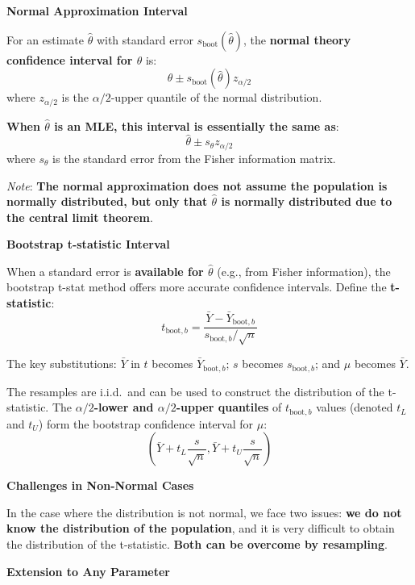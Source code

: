 \documentclass[12pt,a4paper]{article}
\begin{document}
\vspace{0.5em}

\textbf{Normal Approximation Interval}

For an estimate $\hat{\theta}$ with standard error $s_{\text{boot}}(\hat{\theta})$, the \textbf{normal theory confidence interval for $\theta$} is:
\[
\hat{\theta} \pm s_{\text{boot}}(\hat{\theta}) z_{\alpha/2}
\]
where $z_{\alpha/2}$ is the $\alpha/2$-upper quantile of the normal distribution.

\textbf{When $\hat{\theta}$ is an MLE, this interval is essentially the same as}:
\[
\hat{\theta} \pm s_\theta z_{\alpha/2}
\]
where $s_\theta$ is the standard error from the Fisher information matrix.

\textit{Note}: \textbf{The normal approximation does not assume the population is normally distributed, but only that $\hat{\theta}$ is normally distributed due to the central limit theorem}.

\vspace{0.5em}

\textbf{Bootstrap t-statistic Interval}

When a standard error is \textbf{available for $\hat{\theta}$} (e.g., from Fisher information), the bootstrap t-stat method offers more accurate confidence intervals. Define the \textbf{t-statistic}:
\[
t_{\text{boot},b} = \frac{\bar{Y} - \bar{Y}_{\text{boot},b}}{s_{\text{boot},b}/\sqrt{n}}
\]

The key substitutions: $\bar{Y}$ in $t$ becomes $\bar{Y}_{\text{boot},b}$; $s$ becomes $s_{\text{boot},b}$; and $\mu$ becomes $\bar{Y}$.

The resamples are i.i.d.\ and can be used to construct the distribution of the t-statistic. The \textbf{$\alpha/2$-lower and $\alpha/2$-upper quantiles} of $t_{\text{boot},b}$ values (denoted $t_L$ and $t_U$) form the bootstrap confidence interval for $\mu$:
\[
\left(\bar{Y} + t_L \frac{s}{\sqrt{n}}, \bar{Y} + t_U \frac{s}{\sqrt{n}}\right)
\]

\textbf{Challenges in Non-Normal Cases}

In the case where the distribution is not normal, we face two issues: \textbf{we do not know the distribution of the population}, and it is very difficult to obtain the distribution of the t-statistic. \textbf{Both can be overcome by resampling}.

\vspace{0.5em}

\textbf{Extension to Any Parameter}
\end{document}
